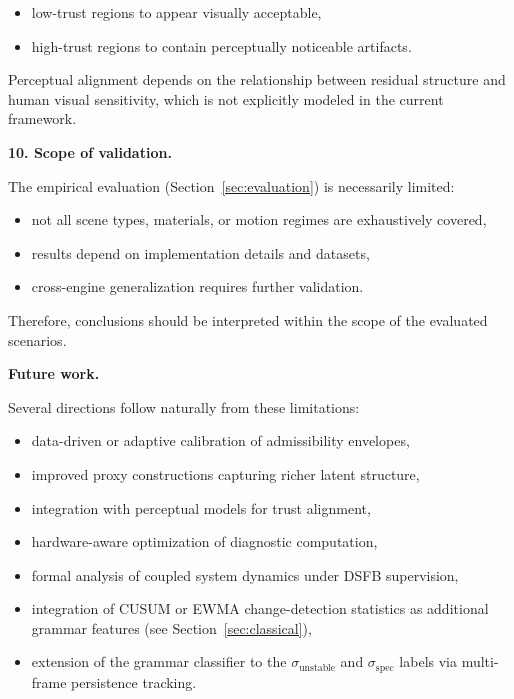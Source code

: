 \documentclass[11pt,letterpaper]{article}
\theoremstyle{gcresult}
\theoremstyle{definition}
\begin{document}
\begin{itemize}[leftmargin=1.5em]
    \item low-trust regions to appear visually acceptable,
    \item high-trust regions to contain perceptually noticeable artifacts.
\end{itemize}

Perceptual alignment depends on the relationship between residual structure and human visual sensitivity, which is not explicitly modeled in the current framework.

\vspace{0.5em}
\noindent
\textbf{10. Scope of validation.}

The empirical evaluation (Section~\ref{sec:evaluation}) is necessarily limited:

\begin{itemize}[leftmargin=1.5em]
    \item not all scene types, materials, or motion regimes are exhaustively covered,
    \item results depend on implementation details and datasets,
    \item cross-engine generalization requires further validation.
\end{itemize}

Therefore, conclusions should be interpreted within the scope of the evaluated scenarios.

\vspace{0.5em}
\noindent
\textbf{Future work.}

Several directions follow naturally from these limitations:

\begin{itemize}[leftmargin=1.5em]
    \item data-driven or adaptive calibration of admissibility envelopes,
    \item improved proxy constructions capturing richer latent structure,
    \item integration with perceptual models for trust alignment,
    \item hardware-aware optimization of diagnostic computation,
    \item formal analysis of coupled system dynamics under DSFB supervision,
    \item integration of CUSUM or EWMA change-detection statistics as additional grammar features (see Section~\ref{sec:classical}),
    \item extension of the grammar classifier to the $\sigma_{\mathrm{unstable}}$ and $\sigma_{\mathrm{spec}}$ labels via multi-frame persistence tracking.
\end{itemize}
\end{document}
